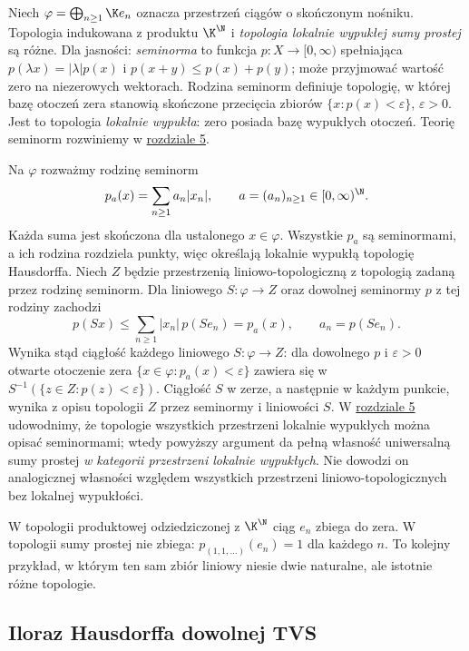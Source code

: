 \begin{przyklad}\label{ex:direct-sum}
Niech $\varphi=\bigoplus_{n\geq1}\K e_n$ oznacza
przestrzeń ciągów o skończonym nośniku. Topologia
indukowana z produktu $\K^{\N}$ i \emph{topologia
lokalnie wypukłej sumy prostej} są różne.
Dla jasności: \emph{seminorma} to funkcja $p:X\to[0,\infty)$
spełniająca $p(\lambda x)=|\lambda|p(x)$ i
$p(x+y)\leq p(x)+p(y)$; może przyjmować wartość zero
na niezerowych wektorach. Rodzina seminorm definiuje topologię,
w której bazę otoczeń zera stanowią skończone przecięcia
zbiorów $\{x:p(x)<\varepsilon\}$, $\varepsilon>0$.
Jest to topologia \emph{lokalnie wypukła}: zero posiada bazę
wypukłych otoczeń. Teorię seminorm rozwiniemy w \hyperref[sec:lokalnie-wypukle]{rozdziale 5}.

Na $\varphi$ rozważmy rodzinę seminorm
\[
 p_a(x)=\sum_{n\geq1}a_n|x_n|,
 \qquad a=(a_n)_{n\geq1}\in[0,\infty)^{\N}.
\]
Każda suma jest skończona dla ustalonego $x\in\varphi$.
Wszystkie $p_a$ są seminormami, a ich rodzina
rozdziela punkty, więc określają lokalnie wypukłą
topologię Hausdorffa. Niech $Z$ będzie przestrzenią
liniowo-topologiczną z topologią zadaną przez rodzinę
seminorm. Dla liniowego $S:\varphi\to Z$ oraz
dowolnej seminormy $p$ z tej rodziny zachodzi
\[
 p(Sx)\leq\sum_{n\geq1}|x_n|\,p(S e_n)
         =p_a(x),\qquad a_n=p(S e_n).
\]
Wynika stąd ciągłość każdego liniowego $S:\varphi\to Z$:
dla dowolnego $p$ i $\varepsilon>0$ otwarte otoczenie zera
$\{x\in\varphi:p_a(x)<\varepsilon\}$ zawiera się w
$S^{-1}(\{z\in Z:p(z)<\varepsilon\})$.
Ciągłość $S$ w zerze, a następnie w każdym punkcie,
wynika z opisu topologii $Z$ przez seminormy i liniowości $S$.
W \hyperref[sec:lokalnie-wypukle]{rozdziale 5} udowodnimy, że topologie wszystkich
przestrzeni lokalnie wypukłych można opisać seminormami;
wtedy powyższy argument da pełną własność uniwersalną
sumy prostej \emph{w kategorii przestrzeni lokalnie wypukłych}.
Nie dowodzi on analogicznej własności względem wszystkich
przestrzeni liniowo-topologicznych bez lokalnej wypukłości.

W topologii produktowej odziedziczonej z $\K^{\N}$
ciąg $e_n$ zbiega do zera. W topologii sumy prostej
nie zbiega: $p_{(1,1,\dots)}(e_n)=1$ dla każdego $n$.
To kolejny przykład, w którym ten sam zbiór liniowy
niesie dwie naturalne, ale istotnie różne topologie.
\end{przyklad}

\subsection{Iloraz Hausdorffa dowolnej TVS}

